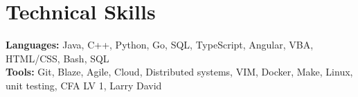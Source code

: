 \documentclass[12pt, letter]{article}
\makeatletter
\newcommand{\resumeItem}[1]{
  \item\small{
    {#1 \vspace{-2pt}}
  }
}
\newcommand{\resumeSubSubheading}[2]{
    \item
    \begin{tabular*}{0.97\textwidth}{l@{\extracolsep{\fill}}r}
      \textit{\small#1} & \textit{\small #2} \\
    \end{tabular*}\vspace{-7pt}
}
\newcommand{\resumeSubHeadingListEnd}{\end{itemize}}
\newcommand{\resumeItemListStart}{\begin{itemize}[noitemsep]} %
\newcommand{\resumeItemListEnd}{\end{itemize}\vspace{-16pt}}
\makeatother
\begin{document}
\vspace{-24pt}




\section{Technical Skills}
{\small
\textbf{Languages:} Java, C++, Python, Go, SQL, TypeScript, Angular, VBA, HTML/CSS, Bash, SQL \\
\textbf{Tools:} Git, Blaze, Agile, Cloud, Distributed systems, VIM, Docker, Make, Linux, unit testing, CFA LV 1, Larry David
}
\end{document}
